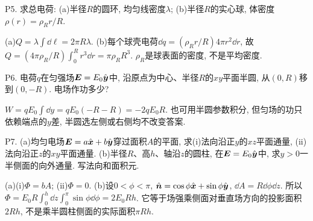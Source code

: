\begin{exercise}
P5. 求总电荷: (a)半径$R$的圆环, 均匀线密度$\lambda$; (b)半径$R$的实心球, 体密度$\rho(r)=\rho_Rr/R$.
\end{exercise}
\begin{solution}
(a)$Q=\lambda\int\dd\ell=2\pi R\lambda$. (b)每个球壳电荷$\dd q=(\rho_Rr/R)4\pi r^2\dd r$, 故$Q=(4\pi\rho_R/R)\int_0^Rr^3\dd r=\pi\rho_RR^3$. $\rho_R$是球表面的密度, 不是平均密度.
\end{solution}

\begin{exercise}
P6. 电荷$q$在匀强场$\boldsymbol{E}=E_0\hat{\boldsymbol{y}}$中, 沿原点为中心、半径$R$的$xy$平面半圆, 从$(0,R)$移到$(0,-R)$. 电场作功多少?
\end{exercise}
\begin{solution}
$W=qE_0\int\dd y=qE_0(-R-R)=-2qE_0R$. 也可用半圆参数积分, 但匀场的功只依赖端点的$y$差, 半圆选左侧或右侧均不改变答案.
\end{solution}

\begin{exercise}
P7. (a)均匀电场$\boldsymbol{E}=a\hat{\boldsymbol{x}}+b\hat{\boldsymbol{y}}$穿过面积$A$的平面, 求(i)法向沿正$y$的$xz$平面通量, (ii)法向沿正$z$的$xy$平面通量. (b)半径$R$、高$h$、轴沿$z$的圆柱, 在$\boldsymbol{E}=E_0\hat{\boldsymbol{y}}$中, 求$y>0$一半侧面的向外通量. 写法向和面积元.
\end{exercise}
\begin{solution}
(a)(i)$\Phi=bA$; (ii)$\Phi=0$. (b)设$0<\phi<\pi$, $\hat{\boldsymbol{n}}=\cos\phi\hat{\boldsymbol{x}}+\sin\phi\hat{\boldsymbol{y}}$, $\dd A=R\dd\phi\dd z$. 所以$\Phi=E_0R\int_0^h\dd z\int_0^\pi\sin\phi\dd\phi=2E_0Rh$. 它等于场强乘侧面对垂直场方向的投影面积$2Rh$, 不是乘半圆柱侧面的实际面积$\pi Rh$.
\end{solution}
